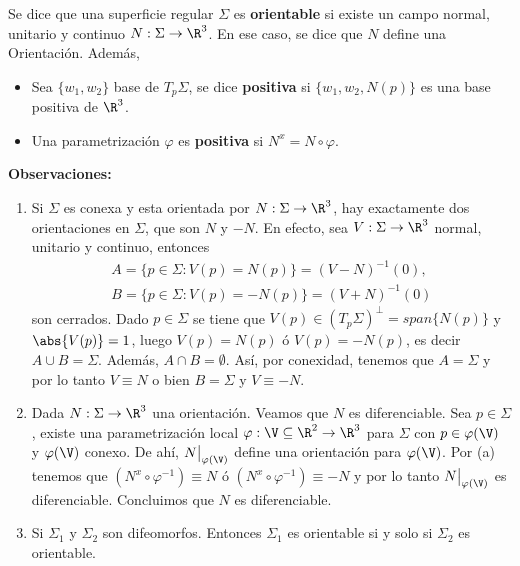 \documentclass{article}
\begin{document}
\begin{dfn}
    Se dice que una superficie regular $\Sigma$ es \textbf{orientable} si existe un campo normal, 
    unitario y continuo $N:\Sigma\to\R^{3}$. En ese caso, se dice que $N$ define una Orientación.
    Además,
    \begin{itemize}
        \item Sea $\{w_{1},w_{2}\}$ base de $T_{p}\Sigma$, se dice \textbf{positiva} si 
        $\{w_{1},w_{2},N(p)\}$ es una base positiva de $\R^{3}$.
        
        \item Una parametrización $\varphi$ es \textbf{positiva} si $N^{x}=N\circ\varphi$.
    \end{itemize}
\end{dfn}

\noindent\textbf{Observaciones:}
\begin{enumerate}
    \item Si $\Sigma$ es conexa y esta orientada por $N:\Sigma\to\R^{3}$, hay exactamente dos
    orientaciones en $\Sigma$, que son $N$ y $-N$. En efecto, sea $V:\Sigma\to\R^{3}$ normal, 
    unitario y continuo, entonces
    \begin{align*}
        A=\{p\in\Sigma:V(p)=N(p)\}=(V-N)^{-1}(0), \\
        B=\{p\in\Sigma:V(p)=-N(p)\}=(V+N)^{-1}(0)
    \end{align*}
    son cerrados. Dado $p\in\Sigma$ se tiene que $V(p)\in\left(T_{p}\Sigma\right)^{\perp}=
    span\{N(p)\}$ y $\abs{V(p)}=1$, luego $V(p)=N(p)$ ó $V(p)=-N(p)$, es decir $A\cup B=\Sigma$. 
    Además, $A\cap B=\emptyset$. Así, por conexidad, tenemos que $A=\Sigma$ y por lo tanto 
    $V\equiv N$ o bien $B=\Sigma$ y $V\equiv -N$.

    \item Dada $N:\Sigma\to\R^{3}$ una orientación. Veamos que $N$ es diferenciable. Sea 
    $p\in\Sigma$, existe una parametrización local $\varphi:\V\subseteq\R^{2}\to\R^{3}$ para 
    $\Sigma$ con $p\in\varphi(\V)$ y $\varphi(\V)$ conexo. De ahí, $N\big|_{\varphi(\V)}$ define 
    una orientación para $\varphi(\V)$. Por (a) tenemos que $(N^{x}\circ\varphi^{-1})\equiv N$ ó
    $(N^{x}\circ\varphi^{-1})\equiv -N$ y por lo tanto $N\big|_{\varphi(\V)}$ es diferenciable. 
    Concluimos que $N$ es diferenciable.

    \item Si $\Sigma_{1}$ y $\Sigma_{2}$ son difeomorfos. Entonces $\Sigma_{1}$ es orientable si y
    solo si $\Sigma_{2}$ es orientable.
\end{enumerate}
\end{document}
